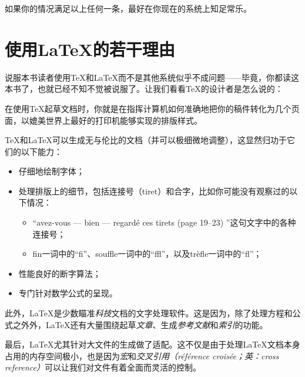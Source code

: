 如果你的情况满足以上任何一条，最好在你现在的系统上知足常乐。

\section*{使用\LaTeX 的若干理由}

说服本书读者使用\TeX 和\LaTeX 而不是其他系统似乎不成问题——毕竟，你都读这本书了，也就已经不知不觉被说服了。让我们看看\TeX 的设计者是怎么说的：

\begin{origincitation}
    在使用\TeX 起草文档时，你就是在指挥计算机如何准确地把你的稿件转化为几个页面，以媲美世界上最好的打印机能够实现的排版样式。
\end{origincitation}

\TeX 和\LaTeX 可以生成无与伦比的文档（并可以极细微地调整），这显然归功于它们的以下能力：

\begin{itemize}
    \item 仔细地绘制字体；
    \item 处理排版上的细节，包括连接号（tiret）和合字，比如你可能没有观察过的以下情况：
    \begin{itemize}
        \item “avez-vous --- bien --- regardé ces tirets (page 19--23) ”这句文字中的各种连接号；
        \item fin一词中的“f\/i”、souffle一词中的“f\/f\/l”，以及trèfle一词中的“f\/l”；
    \end{itemize}
    \item 性能良好的断字算法；
    \item 专门针对数学公式的呈现。
\end{itemize}

此外，\LaTeX 是少数瞄准\emph{科技}文档的文字处理软件。这是因为，除了处理方程和公式之外外，\LaTeX 还有大量围绕起草\emph{文章}、生成\emph{参考文献}和\emph{索引}的功能。

最后，\LaTeX 尤其针对大文件的生成做了适配。这不仅是由于处理\LaTeX 文档本身占用的内存空间极小，也是因为\emph{宏}和\emph{交叉引用（référence croisée；英：cross reference）}可以让我们对文件有着全面而灵活的控制。

